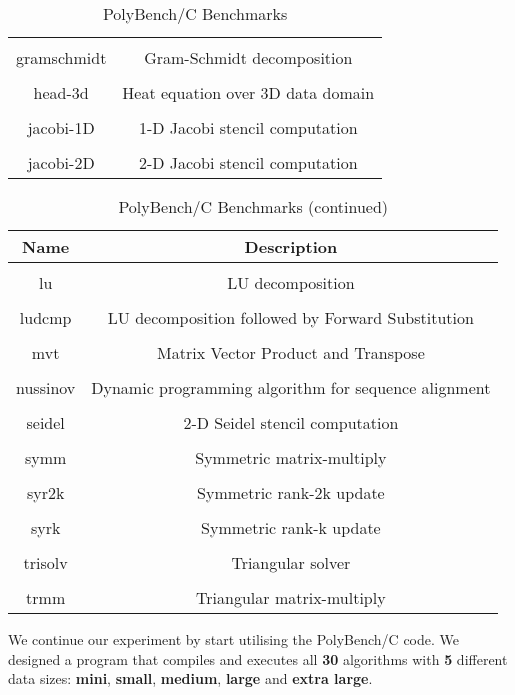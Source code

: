 \begin{table}[h!]
\begin{tabular}{||c c||}
 & \\
gramschmidt & Gram-Schmidt decomposition \\ 
 & \\
head-3d & Heat equation over 3D data domain \\ 
 & \\
jacobi-1D & 1-D Jacobi stencil computation \\ 
 & \\
jacobi-2D & 2-D Jacobi stencil computation \\ [1ex]
\hline
\end{tabular}
\caption{PolyBench/C Benchmarks}
\label{table:time_complexity_2}
\end{table}

\begin{table}[h!]
\centering
\begin{tabular}{||c c||} 
\hline
Name & Description \\ [1ex] 
\hline\hline
 & \\
lu & LU decomposition \\ 
 & \\
ludcmp & LU decomposition followed by Forward Substitution \\ 
 & \\
mvt & Matrix Vector Product and Transpose \\ 
 & \\
nussinov & Dynamic programming algorithm for sequence alignment \\ 
 & \\
seidel & 2-D Seidel stencil computation \\ 
 & \\
symm & Symmetric matrix-multiply \\ 
 & \\
syr2k & Symmetric rank-2k update \\ 
 & \\
syrk & Symmetric rank-k update \\ 
 & \\
trisolv & Triangular solver \\ 
 & \\
trmm & Triangular matrix-multiply \\ [1ex]
\hline
\end{tabular}
\caption{PolyBench/C Benchmarks (continued)}
\label{table:time_complexity_2}
\end{table}

We continue our experiment by start utilising the PolyBench/C code. We designed a program that compiles and executes all \textbf{30} algorithms with \textbf{5} different data sizes: \textbf{mini}, \textbf{small}, \textbf{medium}, \textbf{large} and \textbf{extra large}.

